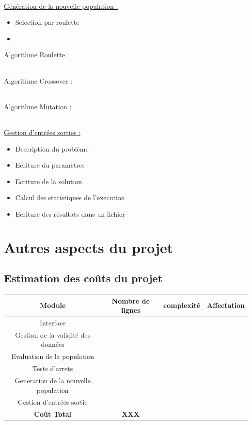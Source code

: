 \documentclass[a4paper,11pt]{article}
\begin{document}
		\hspace{1cm}\\
		\underline{Génération de la nouvelle population : }
		\begin{itemize}
			\item Selection par roulette
			\item 
		\end{itemize}
		Algorithme Roulette :
		
		\hspace{1cm}\\
		Algorithme Crossover :
		
		\hspace{1cm}\\
		Algorithme Mutation :
		
		\hspace{1cm}\\
		\underline{Gestion d'entrées sorties : }
		\begin{itemize}
			\item Description du problème
			\item Ecriture du paramètres
			\item Ecriture de la solution
			\item Calcul des statistiques de l'execution
			\item Ecriture des résultats dans un fichier
		\end{itemize}
		
	\section{Autres aspects du projet}
		\subsection{Estimation des coûts du projet}
			\begin{tabular}{|c|c|c|c|}
				\hline Module & Nombre de lignes & complexité & Affectation \\
				\hline Interface &  &  & \\
				\hline Gestion de la validité des données &  &  & \\
				\hline Evaluation de la population &  &  & \\
				\hline Tests d'arrets &  &  & \\
				\hline Generation de la nouvelle population &  &  & \\
				\hline Gestion d'entrées sortie	&  &  & \\
				\hline \textbf{Coût Total} & \textbf{XXX} & &\\
				\hline 	
				\end{tabular}\vspace{1em}
				
\end{document}
